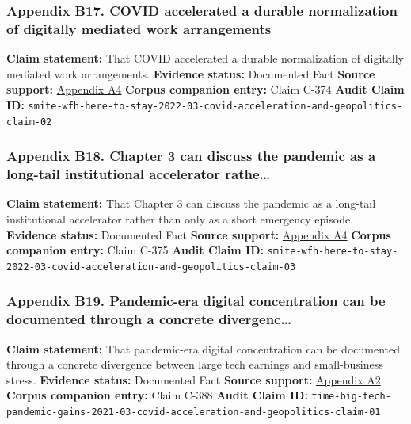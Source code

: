 \documentclass[
  american,
  11pt,
  letterpaper,
]{article}
\begin{document}
\subsubsection{Appendix B17. COVID accelerated a durable normalization
of digitally mediated work
arrangements}\label{appendix-b17-covid-accelerated-a-durable-normalization-of-digitally-mediated-work-arrangements}

\textbf{Claim statement:} That COVID accelerated a durable normalization
of digitally mediated work arrangements. \textbf{Evidence status:}
Documented Fact \textbf{Source support:}
\hyperref[appendix-a4-work-from-home-is-here-to-stay-call-for-flexibility-in-post-pandemic-work-policies]{Appendix
A4} \textbf{Corpus companion entry:} Claim C-374 \textbf{Audit Claim
ID:}
\texttt{smite-wfh-here-to-stay-2022-03-covid-acceleration-and-geopolitics-claim-02}

\subsubsection{Appendix B18. Chapter 3 can discuss the pandemic as a
long-tail institutional accelerator
rathe\ldots{}}\label{appendix-b18-chapter-3-can-discuss-the-pandemic-as-a-long-tail-institutional-accelerator-rathe}

\textbf{Claim statement:} That Chapter 3 can discuss the pandemic as a
long-tail institutional accelerator rather than only as a short
emergency episode. \textbf{Evidence status:} Documented Fact
\textbf{Source support:}
\hyperref[appendix-a4-work-from-home-is-here-to-stay-call-for-flexibility-in-post-pandemic-work-policies]{Appendix
A4} \textbf{Corpus companion entry:} Claim C-375 \textbf{Audit Claim
ID:}
\texttt{smite-wfh-here-to-stay-2022-03-covid-acceleration-and-geopolitics-claim-03}

\subsubsection{Appendix B19. Pandemic-era digital concentration can be
documented through a concrete
divergenc\ldots{}}\label{appendix-b19-pandemic-era-digital-concentration-can-be-documented-through-a-concrete-divergenc}

\textbf{Claim statement:} That pandemic-era digital concentration can be
documented through a concrete divergence between large tech earnings and
small-business stress. \textbf{Evidence status:} Documented Fact
\textbf{Source support:}
\hyperref[appendix-a2-big-tech-announces-striking-pandemic-gains-as-small-businesses-strain-to-find-their-footing]{Appendix
A2} \textbf{Corpus companion entry:} Claim C-388 \textbf{Audit Claim
ID:}
\texttt{time-big-tech-pandemic-gains-2021-03-covid-acceleration-and-geopolitics-claim-01}
\end{document}
